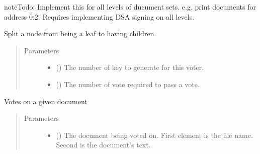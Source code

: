 \documentclass[letterpaper,10pt,english]{sphinxmanual}
\begin{document}
\begin{fulllineitems}
\begin{fulllineitems}
\begin{quote}
\begin{description}
\end{description}\end{quote}

\begin{sphinxadmonition}{note}{Todo:}
Implement this for all levels of ducument sets. e.g. print documents for address 0:2.
Requires implementing DSA signing on all levels.
\end{sphinxadmonition}

\end{fulllineitems}


\begin{fulllineitems}
\label{\detokenize{index:ThresTree.TreeNode.split}}
Split a node from being a leaf to having children.
\begin{quote}\begin{description}
\item[{Parameters}] \leavevmode\begin{itemize}
\item {} 
 () \textendash{} The number of key to generate for this voter.

\item {} 
 () \textendash{} The number of vote required to pass a vote.

\end{itemize}

\end{description}\end{quote}

\end{fulllineitems}


\begin{fulllineitems}
\label{\detokenize{index:ThresTree.TreeNode.vote}}
Votes on a given document
\begin{quote}\begin{description}
\item[{Parameters}] \leavevmode\begin{itemize}
\item {} 
 (\sphinxstyleliteralemphasis{, }) \textendash{} The document being voted on. First element is the file name. Second is the document’s text.


\end{itemize}
\end{description}
\end{quote}
\end{fulllineitems}
\end{fulllineitems}
\end{document}
